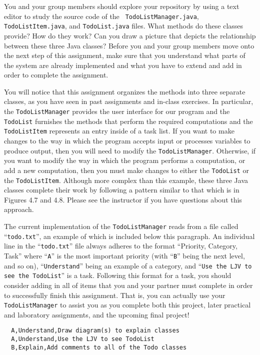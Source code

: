 \documentclass[11pt]{article}
\begin{document}
You and your group members should explore your repository by using a text editor to study the source code of the {\tt
TodoListManager.java}, {\tt TodoListItem.java}, and {\tt TodoList.java} files. What methods do these classes provide?
How do they work? Can you draw a picture that depicts the relationship between these three Java classes? Before you and
your group members move onto the next step of this assignment, make sure that you understand what parts of the system
are already implemented and what you have to extend and add in order to complete the assignment.

You will notice that this assignment organizes the methods into three separate classes, as you have seen in past
assignments and in-class exercises. In particular, the {\tt TodoListManager} provides the user interface for our program
and the {\tt TodoList} furnishes the methods that perform the required computations and the {\tt TodoListItem}
represents an entry inside of a task list. If you want to make changes to the way in which the program accepts input or
processes variables to produce output, then you will need to modify the {\tt TodoListManager}. Otherwise, if you want to
modify the way in which the program performs a computation, or add a new computation, then you must make changes to
either the {\tt TodoList} or the {\tt TodoListItem}. Although more complex than this example, these three Java classes
complete their work by following a pattern similar to that which is in Figures 4.7 and 4.8. Please see the instructor if
you have questions about this approach.

The current implementation of the {\tt TodoListManager} reads from a file called ``{\tt todo.txt}'', an example of which
is included below this paragraph. An individual line in the ``{\tt todo.txt}'' file always adheres to the format
``Priority, Category, Task'' where ``{\tt A}'' is the most important priority (with ``{\tt B}'' being the next level,
and so on), ``{\tt Understand}'' being an example of a category, and ``{\tt Use the LJV to see the TodoList}'' is a
task.  Following this format for a task, you should consider adding in all of items that you and your partner must
complete in order to successfully finish this assignment. That is, you can actually use your {\tt TodoListManager} to
assist you as you complete both this project, later practical and laboratory assignments, and the upcoming final
project!

\begin{verbatim}
  A,Understand,Draw diagram(s) to explain classes
  A,Understand,Use the LJV to see TodoList
  B,Explain,Add comments to all of the Todo classes
\end{verbatim}
\end{document}
